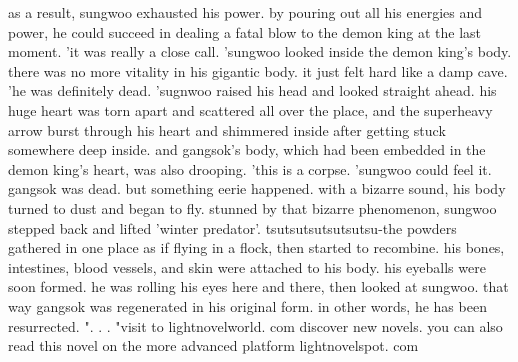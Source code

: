 as a result, sungwoo exhausted his power.
by pouring out all his energies and power, he could succeed in dealing a fatal blow to the demon king at the last moment.
'it was really a close call.
'sungwoo looked inside the demon king's body.
 there was no more vitality in his gigantic body.
 it just felt hard like a damp cave.
'he was definitely dead.
'sugnwoo raised his head and looked straight ahead.
his huge heart was torn apart and scattered all over the place, and the superheavy arrow burst through his heart and shimmered inside after getting stuck somewhere deep inside.
 and gangsok's body, which had been embedded in the demon king's heart, was also drooping.
'this is a corpse.
'sungwoo could feel it.
 gangsok was dead.
but something eerie happened.
with a bizarre sound, his body turned to dust and began to fly.
stunned by that bizarre phenomenon, sungwoo stepped back and lifted 'winter predator'.
tsutsutsutsutsutsu-the powders gathered in one place as if flying in a flock, then started to recombine.
his bones, intestines, blood vessels, and skin were attached to his body.
 his eyeballs were soon formed.
 he was rolling his eyes here and there, then looked at sungwoo.
that way gangsok was regenerated in his original form.
in other words, he has been resurrected.
".
.
.
"visit to lightnovelworld.
com discover new novels.
 you can also read this novel on the more advanced platform lightnovelspot.
com

 